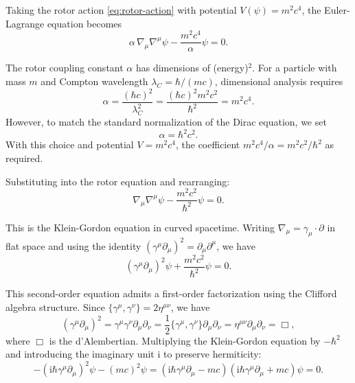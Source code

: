 \documentclass[11pt,a4paper]{article}
\numberwithin{equation}{section}
\theoremstyle{plain}
\theoremstyle{definition}
\theoremstyle{remark}
\newcommand{\ii}{\mathrm{i}}
\begin{document}
Taking the rotor action \eqref{eq:rotor-action} with potential $V(\psi) = m^2c^4$, the Euler-Lagrange equation becomes
\begin{equation}
\alpha\, \nabla_\mu \nabla^\mu \psi - \frac{m^2c^4}{\alpha}\psi = 0.
\end{equation}

The rotor coupling constant $\alpha$ has dimensions of (energy)$^{2}$. For a particle with mass $m$ and Compton wavelength $\lambda_C = \hbar/(mc)$, dimensional analysis requires
\begin{equation}
\alpha = \frac{(\hbar c)^2}{\lambda_C^2} = \frac{(\hbar c)^2 m^2c^2}{\hbar^2} = m^2c^4.
\end{equation}
However, to match the standard normalization of the Dirac equation, we set
\begin{equation}
\alpha = \hbar^2c^2.
\end{equation}
With this choice and potential $V = m^2c^4$, the coefficient $m^2c^4/\alpha = m^2c^2/\hbar^2$ as required.

Substituting into the rotor equation and rearranging:
\begin{equation}
\nabla_\mu \nabla^\mu \psi - \frac{m^2c^2}{\hbar^2}\psi = 0.
\end{equation}

This is the Klein-Gordon equation in curved spacetime. Writing $\nabla_\mu = \gamma_\mu \cdot \partial$ in flat space and using the identity $(\gamma^\mu \partial_\mu)^2 = \partial_\mu \partial^\mu$, we have
\begin{equation}
(\gamma^\mu \partial_\mu)^2 \psi + \frac{m^2c^2}{\hbar^2}\psi = 0.
\end{equation}

This second-order equation admits a first-order factorization using the Clifford algebra structure. Since $\{\gamma^\mu, \gamma^\nu\} = 2\eta^{\mu\nu}$, we have
\begin{equation}
(\gamma^\mu \partial_\mu)^2 = \gamma^\mu \gamma^\nu \partial_\mu \partial_\nu = \frac{1}{2}\{\gamma^\mu, \gamma^\nu\}\partial_\mu \partial_\nu = \eta^{\mu\nu}\partial_\mu \partial_\nu = \Box,
\end{equation}
where $\Box$ is the d'Alembertian. Multiplying the Klein-Gordon equation by $-\hbar^2$ and introducing the imaginary unit $\ii$ to preserve hermiticity:
\begin{equation}
-(\ii\hbar\gamma^\mu \partial_\mu)^2\psi - (mc)^2\psi = (\ii\hbar\gamma^\mu \partial_\mu - mc)(\ii\hbar\gamma^\mu \partial_\mu + mc)\psi = 0.
\end{equation}
\end{document}
